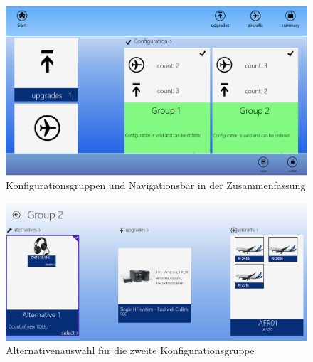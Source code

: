 \begin{figure}[H]
\centering
\includegraphics[width=\hsize]{images/impl/app_bar_impl}
\caption{Konfigurationsgruppen und Navigationsbar in der Zusammenfassung}
\label{configurationResultImpl}
\end{figure}
\begin{figure}[H]
\centering
\includegraphics[width=\hsize]{images/impl/alternative_impl}
\caption{Alternativenauswahl für die zweite Konfigurationsgruppe}
\label{alternativeSelectionImpl}
\end{figure}

 